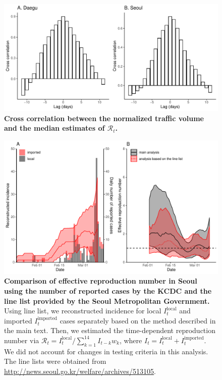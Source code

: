 \pagebreak

\begin{figure}[!ht]
\includegraphics[width=\textwidth]{figure_cross.pdf}
\caption{
\textbf{Cross correlation between the normalized traffic volume and the median estimates of $\mathcal R_t$.}
}
\end{figure}

\pagebreak

\begin{figure}[!ht]
\includegraphics[width=\textwidth]{figure_R_t_seoul_linelist.pdf}
\caption{
\textbf{Comparison of effective reproduction number in Seoul using the number of reported cases by the KCDC and the line list provided by the Seoul Metropolitan Government.}
Using line list, we reconstructed incidence for local $I_t^{\textrm{local}}$ and imported $I_t^{\textrm{imported}}$ cases separately based on the method described in the main text. Then, we estimated the time-dependent reproduction number via $\mathcal R_t = I_t^{\textrm{local}}/\sum_{k=1}^{14} I_{t-k} w_k$, where $I_t=I_t^{\textrm{local}}+I_t^{\textrm{imported}}$. We did not account for changes in testing criteria in this analysis.
The line lists were obtained from \url{http://news.seoul.go.kr/welfare/archives/513105}.
}
\end{figure}
